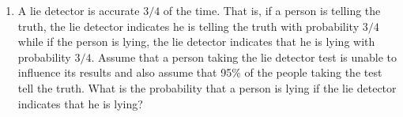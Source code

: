 \documentclass[12pt]{article}
\begin{document}
\begin{enumerate}
\newpage

  \item A lie detector is accurate $3/4$ of the time. That is, if a person is telling the truth, the lie detector indicates he is telling the truth with probability $3/4$ while if the person is lying, the lie detector indicates that he is lying with probability $3/4$. Assume that a person taking the lie detector test is unable to influence its results and also assume that 95\% of the people taking the test tell the truth. What is the probability that a person is lying if the lie detector indicates that he is lying?
\end{enumerate}
\end{document}
